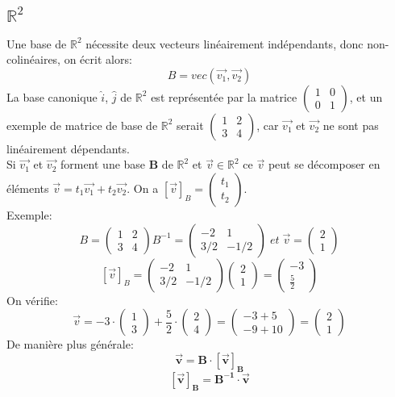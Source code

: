 \documentclass[10pt,a4paper]{book}
\newcommand{\R}{\mathbb{R}}
\begin{document}
\subsection{\texorpdfstring{$\R^2$}{R2}}

Une base de $\R^2 $ nécessite deux vecteurs linéairement indépendants, donc non-colinéaires, on écrit alors:
\[B = vec\left(\vec{v_1}, \vec{v_2}\right)\]
La base canonique $\hat{i}$, $\hat{j}$ de $\R^2$ est représentée par la matrice \(\begin{pmatrix}
1 & 0 \\ 0 & 1 \end{pmatrix}\), et un exemple de matrice de base de $\R^2$ serait \(\begin{pmatrix}1 & 2 \\ 3 & 4\end{pmatrix}\), car $\vec{v_1}$ et $\vec{v_2}$ ne sont pas linéairement dépendants. \\
Si $\vec{v_1}$ et $\vec{v_2}$ forment une base \textbf{B} de $\R^2$ et $\vec{v} \in \R^2$ ce $\vec{v}$ peut se décomposer en éléments \(\vec{v} = t_1\vec{v_1} + t_2\vec{v_2}\). On a $[\vec{v}]_B = \begin{pmatrix} t_1 \\ t_2 \end{pmatrix}$. \\
Exemple:
\[B = \begin{pmatrix}1 & 2 \\ 3 & 4\end{pmatrix} B^{-1} = \begin{pmatrix}-2 & 1 \\ 3/2 & -1/2\end{pmatrix} \; et \; \vec{v} = \begin{pmatrix} 2 \\ 1 \end{pmatrix}\]
\[[\vec{v}]_B = \begin{pmatrix}-2 & 1 \\ 3/2 & -1/2\end{pmatrix}\begin{pmatrix} 2 \\ 1 \end{pmatrix} = \begin{pmatrix} -3 \\ \frac{5}{2} \end{pmatrix}\]
On vérifie:
\[\vec{v} = -3\cdot \begin{pmatrix}1 \\ 3\end{pmatrix} + \frac{5}{2}\cdot \begin{pmatrix} 2 \\ 4 \end{pmatrix} = \begin{pmatrix} -3+5 \\ -9+10 \end{pmatrix} = \begin{pmatrix} 2 \\ 1 \end{pmatrix}\]
De manière plus générale:
\[\mathbf{\vec{v} = B\cdot [\vec{v}]_B}\]
\[\mathbf{[\vec{v}]_B = B^{-1}\cdot \vec{v}}\]
\end{document}
